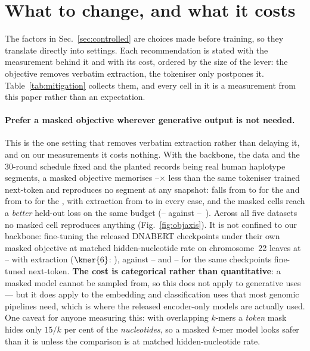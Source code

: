 \section{What to change, and what it costs}
\label{sec:mitigation}

The factors in Sec.~\ref{sec:controlled} are choices made before training, so they translate
directly into settings. Each recommendation is stated with the measurement behind it and with its
cost, ordered by the size of the lever: the objective removes verbatim extraction, the tokeniser
only postpones it. Table~\ref{tab:mitigation} collects them, and every cell in it is a
measurement from this paper rather than an expectation.

\paragraph{Prefer a masked objective wherever generative output is not needed.}
This is the one setting that removes verbatim extraction rather than delaying it, and on our
measurements it costs nothing. With the backbone, the data and the 30-round schedule fixed and the
planted records being real human haplotype segments, a masked objective memorises
--$\times$ less than the same tokeniser trained next-token and reproduces no segment
at any snapshot: \excess{} falls from  to  for the  and from 
to  for the , with extraction from  to  in every case, and the
masked cells reach a \emph{better} held-out loss on the same budget (-- against
--~\bits). Across all five datasets no masked cell reproduces anything
(Fig.~\ref{fig:objaxis}). It is not confined to our backbone: fine-tuning the released DNABERT
checkpoints under their own masked objective at matched hidden-nucleotide rate on chromosome~22
leaves \excess{} at -- with  extraction ($\kmer{6}$: ),
against -- and -- for the same checkpoints fine-tuned
next-token. \textbf{The cost is categorical rather than quantitative}: a masked model cannot be
sampled from, so this does not apply to generative uses --- but it does apply to the embedding and
classification uses that most genomic pipelines need, which is where the released encoder-only
models are actually used. One caveat for anyone measuring this: with overlapping $k$-mers a
 \emph{token} mask hides only $15/k$ per cent of the \emph{nucleotides}, so a masked
$k$-mer model looks safer than it is unless the comparison is at matched hidden-nucleotide rate.

